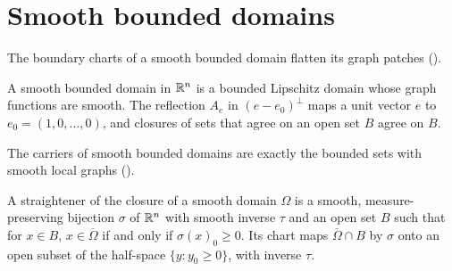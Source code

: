 \section{Smooth bounded domains}
\label{sec:smooth-domains}

The boundary charts of a smooth bounded domain flatten its graph patches
().

\begin{definition}
\label{def:smooth-domain}
\leanok
{}
A smooth bounded domain in $\mathbb{R}^n$ is a bounded Lipschitz domain whose graph functions are smooth.
The reflection $A_e$ in $(e - e_0)^\perp$ maps a unit vector $e$ to $e_0 = (1, 0, \dots, 0)$, and
closures of sets that agree on an open set $B$ agree on $B$.
\end{definition}

The carriers of smooth bounded domains are exactly the bounded sets with smooth local graphs
().

\begin{definition}
\label{def:straightener}
\leanok
{}
A straightener of the closure of a smooth domain $\Omega$ is a smooth, measure-preserving bijection
$\sigma$ of $\mathbb{R}^n$ with smooth inverse $\tau$ and an open set $B$ such that for $x \in B$,
$x \in \overline{\Omega}$ if and only if $\sigma(x)_0 \geq 0$. Its chart maps
$\overline{\Omega} \cap B$ by $\sigma$ onto an open subset of the half-space
$\{y : y_0 \geq 0\}$, with inverse $\tau$.
\end{definition}

